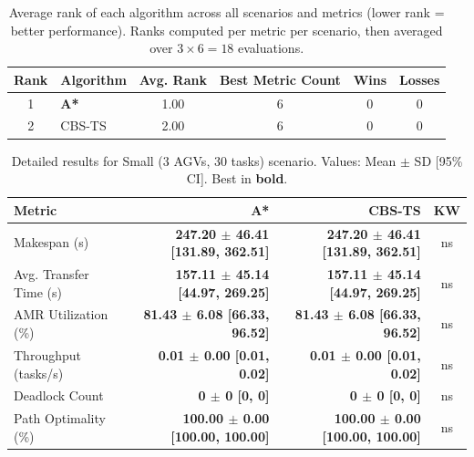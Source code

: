 \documentclass[review]{elsarticle}
\begin{document}
\begin{table}[htbp]
\centering
\caption{Average rank of each algorithm across all scenarios and metrics (lower rank = better performance). Ranks computed per metric per scenario, then averaged over $3 \times 6 = 18$ evaluations.}
\label{tab:ranking}
\begin{tabular}{@{}clcccc@{}}
\toprule
\textbf{Rank} & \textbf{Algorithm} & \textbf{Avg. Rank} & \textbf{Best Metric Count} & \textbf{Wins} & \textbf{Losses} \\
\midrule
1 & \textbf{A*} & 1.00 & 6 & 0 & 0 \\
2 & CBS-TS & 2.00 & 6 & 0 & 0 \\
\bottomrule
\end{tabular}
\end{table}

\begin{table}[htbp]
\centering
\caption{Detailed results for Small (3 AGVs, 30 tasks) scenario. Values: Mean $\pm$ SD [95\% CI]. Best in \textbf{bold}.}
\label{tab:detail_s1_small}
\small
\begin{tabular}{@{}lrrc@{}}
\toprule
\textbf{Metric} & \textbf{A*} & \textbf{CBS-TS} & \textbf{KW} \\
\midrule
Makespan (s) & \textbf{247.20 $\pm$ 46.41 [131.89, 362.51]} & \textbf{247.20 $\pm$ 46.41 [131.89, 362.51]} & ns \\
Avg. Transfer Time (s) & \textbf{157.11 $\pm$ 45.14 [44.97, 269.25]} & \textbf{157.11 $\pm$ 45.14 [44.97, 269.25]} & ns \\
AMR Utilization (\%) & \textbf{81.43 $\pm$ 6.08 [66.33, 96.52]} & \textbf{81.43 $\pm$ 6.08 [66.33, 96.52]} & ns \\
Throughput (tasks/s) & \textbf{0.01 $\pm$ 0.00 [0.01, 0.02]} & \textbf{0.01 $\pm$ 0.00 [0.01, 0.02]} & ns \\
Deadlock Count & \textbf{0 $\pm$ 0 [0, 0]} & \textbf{0 $\pm$ 0 [0, 0]} & ns \\
Path Optimality (\%) & \textbf{100.00 $\pm$ 0.00 [100.00, 100.00]} & \textbf{100.00 $\pm$ 0.00 [100.00, 100.00]} & ns \\
\bottomrule
\end{tabular}
\end{table}
\end{document}
